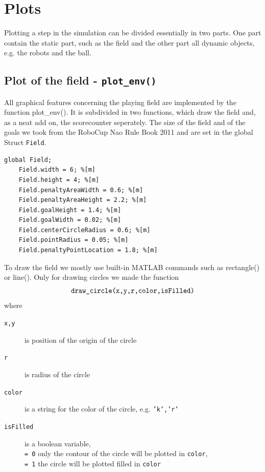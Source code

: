 \section{Plots}
Plotting a step in the simulation can be divided essentially in two parts. One part contain the static part, such as the field and the other part all dynamic objects, e.g. the robots and the ball.

\subsection*{Plot of the field - \texttt{plot\_env()} }
All graphical features concerning the playing field are implemented by the function {\selectfont plot\_env()}. It is subdivided in two functions, which draw the field and, as a neat add on, the scorecounter seperately. The size of the field and of the goals we took from the RoboCup Nao Rule Book 2011 and are set in the global Struct \texttt{Field}.
\begin{lstlisting}
global Field;
    Field.width = 6; %[m]
    Field.height = 4; %[m]
    Field.penaltyAreaWidth = 0.6; %[m]
    Field.penaltyAreaHeight = 2.2; %[m]
    Field.goalHeight = 1.4; %[m]
    Field.goalWidth = 0.02; %[m]
    Field.centerCircleRadius = 0.6; %[m]
    Field.pointRadius = 0.05; %[m]
    Field.penaltyPointLocation = 1.8; %[m]
\end{lstlisting}
\vspace{+10pt}

To draw the field we mostly use built-in MATLAB commands such as {\selectfont rectangle()} or {\selectfont line()}. Only for drawing circles we made the function
	\[ \textnormal{\texttt{draw\_circle(x,y,r,color,isFilled)}}
	\]
where
\begin{description}
	\item[\texttt{x,y}] is position of the origin of the circle
	\item[\texttt{r}] is radius of the circle
	\item[\texttt{color}] is a string for the color of the circle, e.g. \texttt{'k','r'}
	\item[\texttt{isFilled}] is a boolean variable,\\
	\texttt{= 0} only the contour of the circle will be plotted in \texttt{color},\\
	\texttt{= 1} the circle will be plotted filled in \texttt{color}
\end{description}

